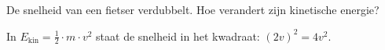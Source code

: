\documentclass{ximera}
\begin{document}
\begin{question}
    De snelheid van een fietser verdubbelt. Hoe verandert zijn kinetische energie?

    \begin{multipleChoice}
    \end{multipleChoice}

    \begin{solution}\nl
        In $E_{\text{kin}} = \frac{1}{2} \cdot m \cdot v^{2}$ staat de snelheid in het kwadraat: $(2v)^{2} = 4 v^{2}$.
    \end{solution}
\end{question}
\end{document}
